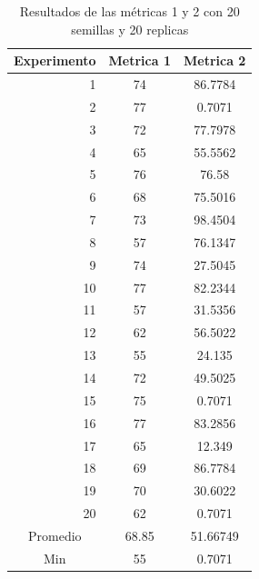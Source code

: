 \documentclass{article}
\begin{document}
\begin{center}
\begin{table}[htbp]
	\centering
	\caption{Resultados  de las métricas 1 y 2 con 20 semillas  y 20 replicas}
	\begin{tabular}{|c|c|c|}
		\hline
		Experimento  & \multicolumn{1}{l|}{Metrica 1} & \multicolumn{1}{p{6.835em}|}{Metrica 2} \\
		\hline
		\multicolumn{1}{|r|}{1} & 74    & 86.7784 \\
		\hline
		\multicolumn{1}{|r|}{2} & 77    & \cellcolor[rgb]{ .663,  .816,  .557}0.7071 \\
		\hline
		\multicolumn{1}{|r|}{3} & 72    & 77.7978 \\
		\hline
		\multicolumn{1}{|r|}{4} & 65    & 55.5562 \\
		\hline
		\multicolumn{1}{|r|}{5} & 76    & 76.58 \\
		\hline
		\multicolumn{1}{|r|}{6} & 68    & 75.5016 \\
		\hline
		\multicolumn{1}{|r|}{7} & 73    & 98.4504 \\
		\hline
		\multicolumn{1}{|r|}{8} & 57    & 76.1347 \\
		\hline
		\multicolumn{1}{|r|}{9} & 74    & 27.5045 \\
		\hline
		\multicolumn{1}{|r|}{10} & 77    & 82.2344 \\
		\hline
		\multicolumn{1}{|r|}{11} & 57    & 31.5356 \\
		\hline
		\multicolumn{1}{|r|}{12} & 62    & 56.5022 \\
		\hline
		\multicolumn{1}{|r|}{13} & \cellcolor[rgb]{ .663,  .816,  .557}55 & 24.135 \\
		\hline
		\multicolumn{1}{|r|}{14} & 72    & 49.5025 \\
		\hline
		\multicolumn{1}{|r|}{15} & 75    & \cellcolor[rgb]{ .663,  .816,  .557}0.7071 \\
		\hline
		\multicolumn{1}{|r|}{16} & 77    & 83.2856 \\
		\hline
		\multicolumn{1}{|r|}{17} & 65    & 12.349 \\
		\hline
		\multicolumn{1}{|r|}{18} & 69    & 86.7784 \\
		\hline
		\multicolumn{1}{|r|}{19} & 70    & 30.6022 \\
		\hline
		\multicolumn{1}{|r|}{20} & 62    & \cellcolor[rgb]{ .663,  .816,  .557}0.7071 \\
		\hline
		Promedio & 68.85 & 51.66749 \\
		\hline
		Min   & 55    & 0.7071 \\
		\hline
	\end{tabular}%
	\label{tab:cuadro 4}%
\end{table}%


\end{center}
\end{document}
